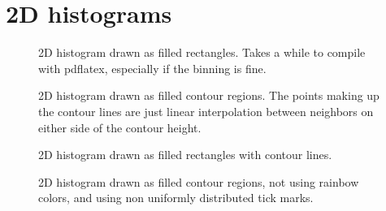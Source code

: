 \documentclass{article}
\begin{document}
\section{2D histograms}
\begin{figure}[H]
\centering

\caption{2D histogram drawn as filled rectangles. Takes a while to compile with pdflatex, 
especially if the binning is fine.}
\end{figure}
\begin{figure}[H]
\centering

\caption{2D histogram drawn as filled contour regions. The points making up the contour lines 
are just linear interpolation between neighbors on either side of the contour height.}
\end{figure}
\begin{figure}[H]
\centering

\caption{2D histogram drawn as filled rectangles with contour lines.}
\end{figure}
\begin{figure}[H]
\centering

\caption{2D histogram drawn as filled contour regions, not using rainbow colors, and using
non uniformly distributed tick marks.}
\end{figure}
\end{document}
